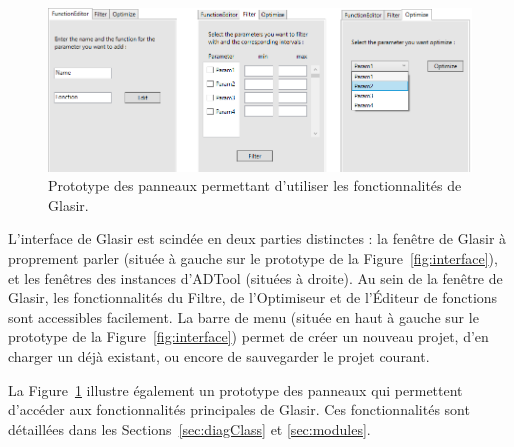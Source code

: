     \begin{figure}[h!]
        \centering
        \hspace*{-0.6cm}
        \includegraphics[height=0.42\textwidth]{figure/ongletsGlasir.png}
        \caption{Prototype des panneaux permettant d'utiliser les fonctionnalités de Glasir.}
        \label{fig:panneaux}
    \end{figure}
    
L'interface de Glasir est scindée en deux parties distinctes : la fenêtre de Glasir à proprement parler (située à gauche sur le prototype de la {\sc Figure}~\ref{fig:interface}), et les fenêtres des instances d'ADTool (situées à droite). Au sein de la fenêtre de Glasir, les fonctionnalités du Filtre, de l'Optimiseur et de l'Éditeur de fonctions sont accessibles facilement. La barre de menu (située en haut à gauche sur le prototype de la {\sc Figure}~\ref{fig:interface}) permet de créer un nouveau projet, d'en charger un déjà existant, ou encore de sauvegarder le projet courant.
    
    La {\sc Figure}~\ref{fig:panneaux} illustre également un prototype des panneaux qui permettent d'accéder aux fonctionnalités principales de Glasir. Ces fonctionnalités sont détaillées dans les {\sc Sections}~\ref{sec:diagClass} et \ref{sec:modules}.  